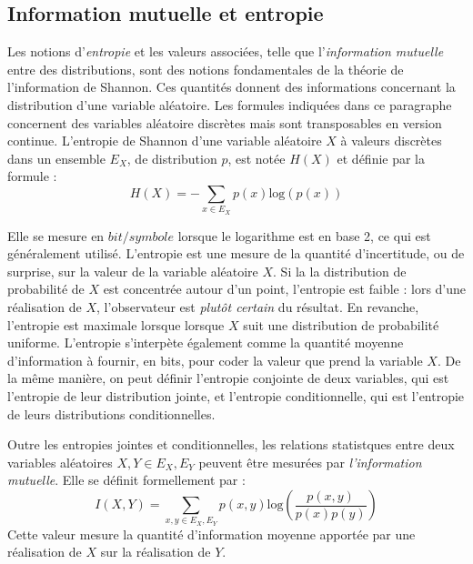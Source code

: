 \subsection{Information mutuelle et entropie}

Les notions d'\emph{entropie} et les valeurs associées, telle que l'\emph{information mutuelle} entre des distributions, sont des notions fondamentales de la théorie de l'information de Shannon. Ces quantités donnent des informations concernant la distribution d'une variable aléatoire.
Les formules indiquées dans ce paragraphe concernent des variables aléatoire discrètes mais sont transposables en version continue.
L'entropie de Shannon d'une variable aléatoire $X$ à valeurs discrètes dans un ensemble $E_X$, de distribution $p$, est notée $H(X)$ et définie par la formule : 
\begin{equation}
H(X) = - \sum_{x \in E_X}{p(x)\textrm{log}(p(x))}
\end{equation}

Elle se mesure en $bit/symbole$ lorsque le logarithme est en base 2, ce qui est généralement utilisé. 
L'entropie est une mesure de la quantité d'incertitude, ou de surprise, sur la valeur de la variable aléatoire $X$. Si la la distribution de probabilité de $X$ est concentrée autour d'un point, l'entropie est faible : lors d'une réalisation de $X$, l'observateur est \emph{plutôt certain} du résultat. En revanche, l'entropie est maximale lorsque lorsque $X$ suit une distribution de probabilité uniforme.
L'entropie s'interpète également comme la quantité moyenne d'information à fournir, en bits, pour coder la valeur que prend la variable $X$.
De la même manière, on peut définir l'entropie conjointe de deux variables, qui est l'entropie de leur distribution jointe, et l'entropie conditionnelle, qui est l'entropie de leurs distributions conditionnelles.

Outre les entropies jointes et conditionnelles, les relations statistques entre deux variables aléatoires $X,Y \in E_X,E_Y$ peuvent être mesurées par \emph{l'information mutuelle}. Elle se définit formellement par : 
\begin{equation}
 I(X,Y) = \sum_{x,y \in E_X,E_Y}{p(x,y)\textrm{log}(\frac{p(x,y)}{p(x)p(y)})}
\end{equation}
Cette valeur mesure la quantité d'information moyenne apportée par une réalisation de $X$ sur la réalisation de $Y$.

